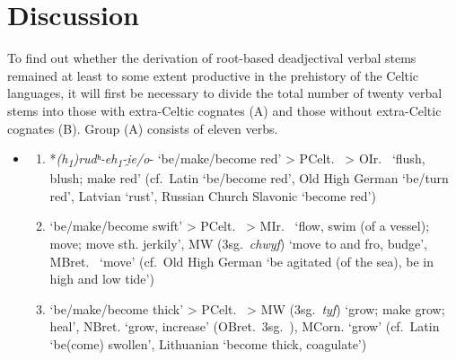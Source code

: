 \documentclass[output=paper,colorlinks,citecolor=brown]{langscibook}
\begin{document}
\section{Discussion}
\label{sec:CelticDiscussion}

To find out whether the derivation of root-based deadjectival verbal stems remained at least to some extent productive in the prehistory of the Celtic languages, it will first be necessary to divide the total number of twenty verbal stems into those with extra-Celtic cognates (A) and those without extra-Celtic cognates (B). Group (A) consists of eleven verbs.

\begin{itemize}
    \item[(A)] 

\begin{enumerate}
    \item {*\textit{(h\textsubscript{1})rudʰ-eh\textsubscript{1}-i̯e/o}-}  ‘be/make/become red’ > PCelt.\  > OIr.\   ‘flush, blush; make red’
        (cf.\ Latin  ‘be/become red’, Old High German  ‘be/turn red’, Latvian  ‘rust’, Russian Church Slavonic  ‘become red’)
        
    \item {} ‘be/make/become swift’ > PCelt.\  > MIr.\  ‘flow, swim (of a vessel); move; move sth. jerkily’, MW  (3sg.\ \textit{chwyf}) ‘move to and fro, budge’, MBret.\  ‘move’
        (cf.\ Old High German  ‘be agitated (of the sea), be in high and low tide’)
        
    \item {} ‘be/make/become thick’ > PCelt.\  > MW  (3sg.\ \textit{tyf}) ‘grow; make grow; heal’, NBret.  ‘grow, increase’ (OBret.\ 3sg.\ ), MCorn.  ‘grow’
        (cf.\ Latin  ‘be(come) swollen’, Lithuanian  ‘become thick, coagulate’)
        

\end{enumerate}
\end{itemize}
\end{document}
